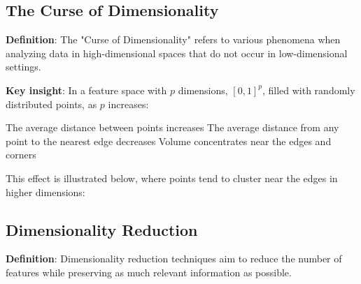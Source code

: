 \subsection{The Curse of Dimensionality}
\textbf{Definition}: The "Curse of Dimensionality" refers to various phenomena when analyzing data in high-dimensional spaces that do not occur in low-dimensional settings.

\textbf{Key insight}: In a feature space with $p$ dimensions, $[0,1]^p$, filled with randomly distributed points, as $p$ increases:
\begin{outline}
    \1 The average distance between points increases
    \1 The average distance from any point to the nearest edge decreases
    \1 Volume concentrates near the edges and corners
\end{outline}

This effect is illustrated below, where points tend to cluster near the edges in higher dimensions:

\begin{center}
\end{center}

\subsection{Dimensionality Reduction}
\textbf{Definition}: Dimensionality reduction techniques aim to reduce the number of features while preserving as much relevant information as possible.

